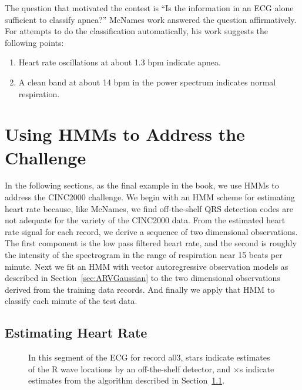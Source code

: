 The question that motivated the contest is ``Is the information in an
ECG alone sufficient to classify apnea?'' McNames work answered the
question affirmatively.  For attempts to do the classification
automatically, his work suggests the following points:
\begin{enumerate}
\item Heart rate oscillations at about 1.3 bpm indicate apnea.
\item A clean band at about 14 bpm in the power spectrum indicates
  normal respiration.
\end{enumerate}

\afterpage{\clearpage}%

\section{Using HMMs to Address the Challenge}
\label{sec:apnea_hmms}

In the following sections, as the final example in the book, we use
HMMs to address the CINC2000 challenge.  We begin with an HMM scheme
for estimating heart rate because, like McNames, we find off-the-shelf
QRS detection codes are not adequate for the variety of the CINC2000
data.  From the estimated heart rate signal for each record, we derive
a sequence of two dimensional observations.  The first component is
the low pass filtered heart rate, and the second is roughly the
intensity of the spectrogram in the range of respiration near 15
beats per minute.  Next we fit an HMM with vector autoregressive
observation models as described in Section~\ref{sec:ARVGaussian} to
the two dimensional observations derived from the training data
records.  And finally we apply that HMM to classify each minute of the
test data.

\subsection{Estimating Heart Rate}
\label{sec:ecg_hmms}

\begin{figure}
  \caption[Inadequate off-the-shelf ECG detectors]%
  {In this segment of the ECG for record a03, stars indicate estimates
    of the R wave locations by an off-the-shelf detector\cite{porr_2024_10573363},
    and $\times$s indicate estimates from the algorithm described in
    Section~\ref{sec:ecg_hmms}. }
  \label{fig:elgendi}
\end{figure}


